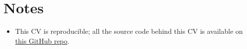 \documentclass[11pt,a4paper,]{moderncv}
\providecommand{\tightlist}{%
	\setlength{\itemsep}{0pt}\setlength{\parskip}{0pt}}
\begin{document}
\hypertarget{notes}{%
\section{Notes}\label{notes}}

\begin{itemize}
\tightlist
\item
  This CV is reproducible; all the source code behind this CV is
  available on \href{https://github.com/sarbearschwartz/jy_CV}{this
  GitHub repo}.
\end{itemize}
\end{document}
